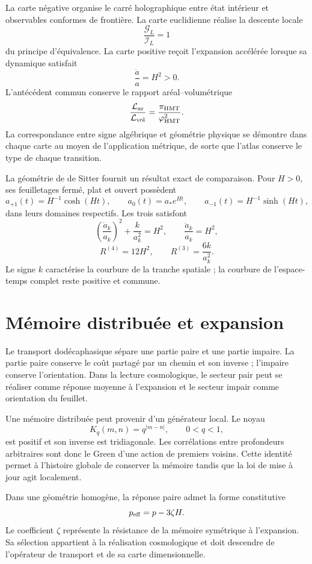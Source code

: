 La carte négative organise le carré holographique entre état intérieur et
observables conformes de frontière. La carte euclidienne réalise la descente locale
\[
 \frac{\mathcal G_L}{\mathcal I_L}=1
\]
du principe d'équivalence. La carte positive reçoit l'expansion
accélérée lorsque sa dynamique satisfait
\[
 \frac{\ddot a}{a}=H^2>0.
\]
L'antécédent commun conserve le rapport aréal--volumétrique
\[
 \frac{\mathcal L_{\rm ar}}{\mathcal L_{\rm vol}}
 =\frac{\pi_{\rm HMT}}{\varphi_{\rm HMT}^2}.
\]
La correspondance entre signe algébrique et géométrie physique se démontre dans
chaque carte au moyen de l'application métrique, de sorte que l'atlas conserve le type de
chaque transition.

La géométrie de de Sitter fournit un résultat exact de comparaison.
Pour \(H>0\), ses feuilletages fermé, plat et ouvert possèdent
\[
 a_{+1}(t)=H^{-1}\cosh(Ht),\qquad
 a_0(t)=a_*e^{Ht},\qquad
 a_{-1}(t)=H^{-1}\sinh(Ht),
\]
dans leurs domaines respectifs. Les trois satisfont
\[
 \left(\frac{\dot a_k}{a_k}\right)^2+\frac{k}{a_k^2}=H^2,
 \qquad
 \frac{\ddot a_k}{a_k}=H^2,
\]
\[
 R^{(4)}=12H^2,\qquad
 R^{(3)}=\frac{6k}{a_k^2}.
\]
Le signe \(k\) caractérise la courbure de la tranche spatiale ; la
courbure de l'espace-temps complet reste positive et commune.

\section{Mémoire distribuée et expansion}

Le transport dodécaphasique sépare une partie paire et une partie impaire. La partie
paire conserve le coût partagé par un chemin et son inverse ; l'impaire conserve
l'orientation. Dans la lecture cosmologique, le secteur pair peut se réaliser
comme réponse moyenne à l'expansion et le secteur impair comme orientation du
feuillet.

Une mémoire distribuée peut provenir d'un générateur local. Le noyau
\[
 K_q(m,n)=q^{|m-n|},\qquad 0<q<1,
\]
est positif et son inverse est tridiagonale. Les corrélations entre profondeurs
arbitraires sont donc le Green d'une action de premiers voisins. Cette
identité permet à l'histoire globale de conserver la mémoire tandis que la loi de
mise à jour agit localement.

Dans une géométrie homogène, la réponse paire admet la forme constitutive
\[
 p_{\rm eff}=p-3\zeta H.
\]
Le coefficient \(\zeta\) représente la résistance de la mémoire symétrique à
l'expansion. Sa sélection appartient à la réalisation cosmologique et doit
descendre de l'opérateur de transport et de sa carte dimensionnelle.

